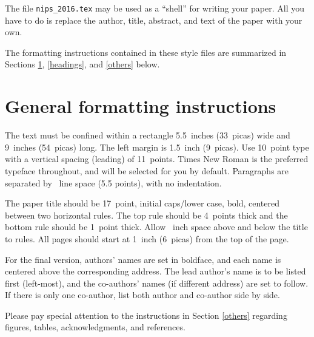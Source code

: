 \documentclass{article}
\begin{document}
The file \verb+nips_2016.tex+ may be used as a ``shell'' for writing
your paper. All you have to do is replace the author, title, abstract,
and text of the paper with your own.

The formatting instructions contained in these style files are
summarized in Sections \ref{gen_inst}, \ref{headings}, and
\ref{others} below.

\section{General formatting instructions}
\label{gen_inst}

The text must be confined within a rectangle 5.5~inches (33~picas)
wide and 9~inches (54~picas) long. The left margin is 1.5~inch
(9~picas).  Use 10~point type with a vertical spacing (leading) of
11~points.  Times New Roman is the preferred typeface throughout, and
will be selected for you by default.  Paragraphs are separated by
~line space (5.5 points), with no indentation.

The paper title should be 17~point, initial caps/lower case, bold,
centered between two horizontal rules. The top rule should be 4~points
thick and the bottom rule should be 1~point thick. Allow
~inch space above and below the title to rules. All
pages should start at 1~inch (6~picas) from the top of the page.

For the final version, authors' names are set in boldface, and each
name is centered above the corresponding address. The lead author's
name is to be listed first (left-most), and the co-authors' names (if
different address) are set to follow. If there is only one co-author,
list both author and co-author side by side.

Please pay special attention to the instructions in Section \ref{others}
regarding figures, tables, acknowledgments, and references.
\end{document}
